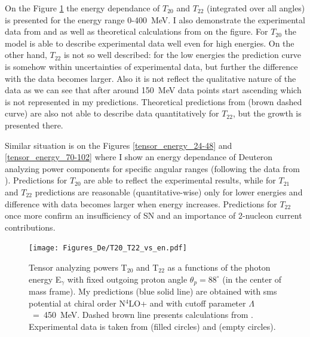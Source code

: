     On the Figure \ref{T20_vs_en} the energy dependance of $T_{20}$ and $T_{22}$
    (integrated over all angles)
    is presented for the energy range 0-400~MeV. I also demonstrate the experimental data from
    \cite{rachek2007} and \cite{mishev1993} as well as theoretical calculations from \cite{Schmitt1989}
    on the figure. For $T_{20}$ the model is able to describe experimental data well even for
    high energies. On the other hand, $T_{22}$ is not so well described: for the low 
    energies the prediction curve is somehow within uncertainties of experimental data,
    but further the difference with the data becomes larger. Also it is not 
    reflect the qualitative nature of the data as we can see that after around 150~MeV
    data points start ascending which is not represented in my predictions.
    Theoretical predictions from \cite{Schmitt1989} (brown dashed curve) are also not able
    to describe data quantitatively for $T_{22}$, but the growth is presented there. 

    Similar situation is on the Figures \ref{tensor_energy_24-48} and \ref{tensor_energy_70-102}
    where I show an energy dependance of Deuteron analyzing power components for 
    specific angular ranges (following the data from \cite{rachek2007}).
    Predictions for $T_{20}$ are able to reflect the experimental results,
    while for $T_{21}$ and $T_{22}$ predictions are reasonable (quantitative-wise) 
    only for lower energies and difference with data becomes larger
    when energy increases. Predictions for $T_{22}$ once more 
    confirm an insufficiency of SN and an importance of
    2-nucleon current contributions. 
    

    \begin{figure}[h]
        \begin{center}
        \texttt{[image: Figures\_De/T20\_T22\_vs\_en.pdf]}
        \end{center}
        \caption{Tensor analyzing powers T$_{20}$ and T$_{22}$ as a functions of the photon energy E$_\gamma$
        with fixed outgoing proton angle $\theta_p = 88^{\circ}$ (in the center of mass frame).
        My predictions (blue solid line) are obtained with \gls*{sms} potential at chiral order N$^4$LO+
        and with cutoff parameter $\Lambda$~=~450~MeV.
        Dashed brown line presents calculations from \cite{Schmitt1989}.
        Experimental data is taken from \cite{rachek2007} (filled circles)
        and \cite{mishev1993} (empty circles).}
        \label{T20_vs_en}
    \end{figure}

